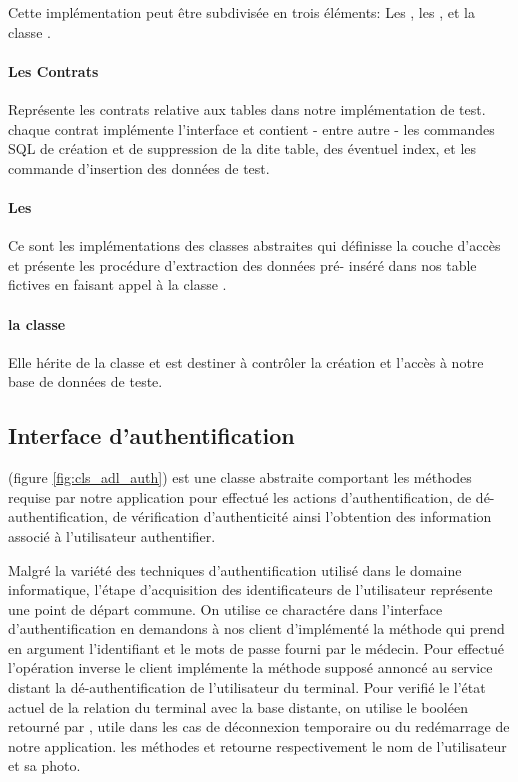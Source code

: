 Cette implémentation peut être subdivisée en trois éléments: Les , les , et la classe .

\paragraph{Les Contrats}

Représente les contrats relative aux tables dans notre implémentation de
test. chaque contrat implémente l'interface
 et contient - entre autre - les
commandes SQL de création et de suppression de la dite table, des
éventuel index, et les commande d'insertion des données de test.

\paragraph{Les } 

Ce sont les implémentations des classes abstraites qui définisse la
couche d’accès et présente les procédure d'extraction des données pré-
inséré dans nos table fictives en faisant appel à la classe
 .

\paragraph[la classe \dev{DBSetup}]{la classe } 

Elle hérite de la classe  et est destiner à
contrôler la création et l’accès à notre base de données de teste.

\subsection{Interface d'authentification}

 (figure
\ref{fig:cls_adl_auth}) est une classe abstraite comportant les méthodes
requise par notre application pour effectué les actions
d'authentification, de dé-authentification, de vérification
d'authenticité ainsi l'obtention des information associé à l'utilisateur
authentifier.

Malgré la variété des techniques d'authentification utilisé dans le
domaine informatique, l'étape d'acquisition des identificateurs de
l'utilisateur représente une point de départ commune. On utilise ce
charactére dans l'interface d'authentification en demandons à nos client
d'implémenté la méthode  qui prend en argument
l'identifiant et le mots de passe fourni par le médecin. Pour effectué
l’opération inverse le client implémente la méthode 
supposé annoncé au service distant la dé-authentification de
l'utilisateur du terminal. Pour verifié le l'état actuel de la relation
du terminal avec la base distante, on utilise le booléen retourné par
, utile dans les cas de déconnexion temporaire ou du
redémarrage de notre application. les méthodes  et
 retourne respectivement le nom de l'utilisateur et sa
photo.

